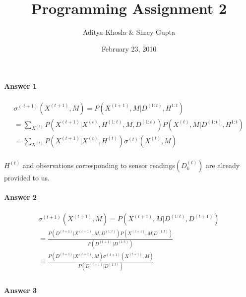 \documentclass[12pt]{article}
\title{Programming Assignment 2}
\author{Aditya Khosla \& Shrey Gupta}
\date{February 23, 2010}
\begin{document}
\maketitle

\paragraph{Answer 1} 

\[
\begin{array}{l}
 {\sigma ^{( \cdot t + 1)}}({X^{(t + 1)}},M) = P({X^{(t + 1)}},M|{D^{(1:t)}}, {H^{1:t}}) \\ 
  = \sum\limits_{{X^{(t)}}} {P({X^{(t + 1)}}|{X^{(t)}},{H^{(1:t)}},M,{D^{(1:t)}})} P({X^{(t)}},M|{D^{(1:t)}}, {H^{1:t}}) \\ 
  = \sum\limits_{{X^{(t)}}} {P({X^{(t + 1)}}|{X^{(t)}},{H^{(t)}}){\sigma ^{(t)}}({X^{(t)}},M)}  \\ 
 \end{array}
 
 \]
 
 ${H^{(t)}}$ and observations corresponding to sensor readings$(D_k^{(t)})$ are already provided to us. \\
\paragraph{Answer 2} 

\[\begin{array}{l}
 {\sigma ^{(t + 1)}}({X^{(t + 1)}},M) = P({X^{(t + 1)}},M|{D^{(1:t)}},{D^{(t + 1)}}) \\ 
  = \frac{{P({D^{(t + 1)}}|{X^{(t + 1)}},M,{D^{(1:t)}})P({X^{(t + 1)}},M|{D^{(1:t)}})}}{{P({D^{(t + 1)}}|{D^{(1:t)}})}} \\ 
  = \frac{{P({D^{(t + 1)}}|{X^{(t + 1)}},M){\sigma ^{( \cdot t + 1)}}({X^{(t + 1)}},M)}}{{P({D^{(t + 1)}}|{D^{(1:t)}})}} \\ 
 \end{array}\]

\paragraph{Answer 3}
\end{document}
